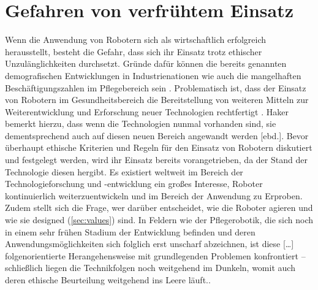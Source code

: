\section{Gefahren von verfrühtem Einsatz}
\label{sec:gefahren}
Wenn die Anwendung von Robotern sich als wirtschaftlich erfolgreich herausstellt, besteht die Gefahr, dass sich ihr Einsatz trotz ethischer Unzulänglichkeiten durchsetzt. Gründe dafür können die bereits genannten demografischen Entwicklungen in Industrienationen wie auch die mangelhaften Beschäftigungszahlen im Pflegebereich sein \cite[28 ff]{sharky}. Problematisch ist, dass der Einsatz von Robotern im Gesundheitsbereich die Bereitstellung von weiteren Mitteln zur Weiterentwicklung und Erforschung neuer Technologien rechtfertigt \cite[57]{haker}. Haker bemerkt hierzu, dass wenn die Technologien nunmal vorhanden sind, sie dementsprechend auch auf diesen neuen Bereich angewandt werden [ebd.]. Bevor überhaupt ethische Kriterien und Regeln für den Einsatz von Robotern diskutiert und festgelegt werden, wird ihr Einsatz bereits vorangetrieben, da der Stand der Technologie diesen hergibt. Es existiert weltweit im Bereich der Technologieforschung und -entwicklung ein großes Interesse, Roboter kontinuierlich weiterzuentwickeln und im Bereich der Anwendung zu Erproben. Zudem stellt sich die Frage, wer darüber entscheidet, wie die Roboter agieren und wie sie designed (\ref{sec:values}) sind. \glqq In Feldern wie der Pflegerobotik, die sich noch in einem sehr frühen Stadium der Entwicklung befinden und deren Anwendungsmöglichkeiten sich folglich erst unscharf abzeichnen, ist diese […] folgenorientierte Herangehensweise mit grundlegenden Problemen konfrontiert – schließlich liegen die Technikfolgen noch weitgehend im Dunkeln, womit auch deren ethische Beurteilung weitgehend ins Leere läuft.\grqq \cite[148]{kehl}.
